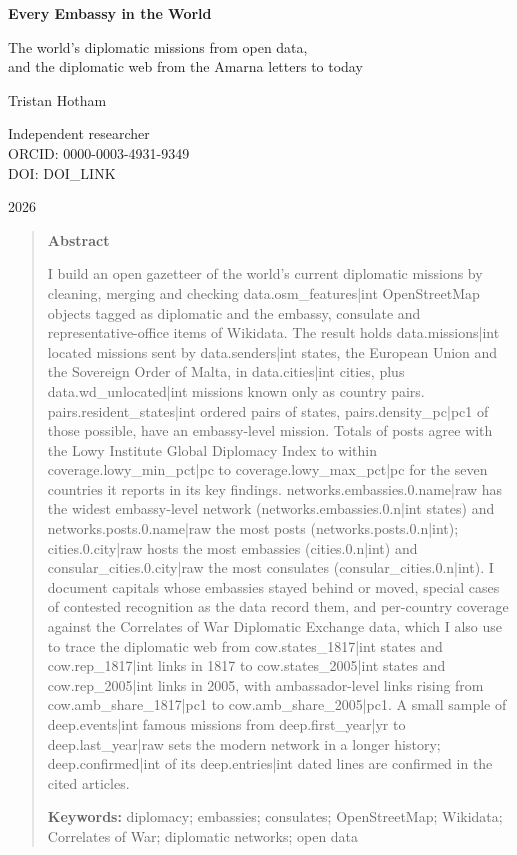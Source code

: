 \documentclass[11pt,a4paper]{article}
\begin{document}
\begin{center}
{\Large\bfseries Every Embassy in the World\par}
\vspace{0.4em}
{\large The world's diplomatic missions from open data,\\and the diplomatic web from the Amarna letters to today\par}
\vspace{1.2em}
{\large Tristan Hotham\par}
\vspace{0.3em}
{\small Independent researcher\\
ORCID: 0000-0003-4931-9349\\
DOI: {{DOI_LINK}}\par}
\vspace{0.8em}
2026
\end{center}

\begin{quote}
\small
\begin{center}\textbf{Abstract}\end{center}
I build an open gazetteer of the world's current diplomatic missions by cleaning, merging and checking {{data.osm_features|int}} OpenStreetMap objects tagged as diplomatic and the embassy, consulate and representative-office items of Wikidata. The result holds {{data.missions|int}} located missions sent by {{data.senders|int}} states, the European Union and the Sovereign Order of Malta, in {{data.cities|int}} cities, plus {{data.wd_unlocated|int}} missions known only as country pairs. {{pairs.resident_states|int}} ordered pairs of states, {{pairs.density_pc|pc1}} of those possible, have an embassy-level mission. Totals of posts agree with the Lowy Institute Global Diplomacy Index to within {{coverage.lowy_min_pct|pc}} to {{coverage.lowy_max_pct|pc}} for the seven countries it reports in its key findings. {{networks.embassies.0.name|raw}} has the widest embassy-level network ({{networks.embassies.0.n|int}} states) and {{networks.posts.0.name|raw}} the most posts ({{networks.posts.0.n|int}}); {{cities.0.city|raw}} hosts the most embassies ({{cities.0.n|int}}) and {{consular_cities.0.city|raw}} the most consulates ({{consular_cities.0.n|int}}). I document capitals whose embassies stayed behind or moved, special cases of contested recognition as the data record them, and per-country coverage against the Correlates of War Diplomatic Exchange data, which I also use to trace the diplomatic web from {{cow.states_1817|int}} states and {{cow.rep_1817|int}} links in 1817 to {{cow.states_2005|int}} states and {{cow.rep_2005|int}} links in 2005, with ambassador-level links rising from {{cow.amb_share_1817|pc1}} to {{cow.amb_share_2005|pc1}}. A small sample of {{deep.events|int}} famous missions from {{deep.first_year|yr}} to {{deep.last_year|raw}} sets the modern network in a longer history; {{deep.confirmed|int}} of its {{deep.entries|int}} dated lines are confirmed in the cited articles.

\textbf{Keywords:} diplomacy; embassies; consulates; OpenStreetMap; Wikidata; Correlates of War; diplomatic networks; open data
\end{quote}
\end{document}
